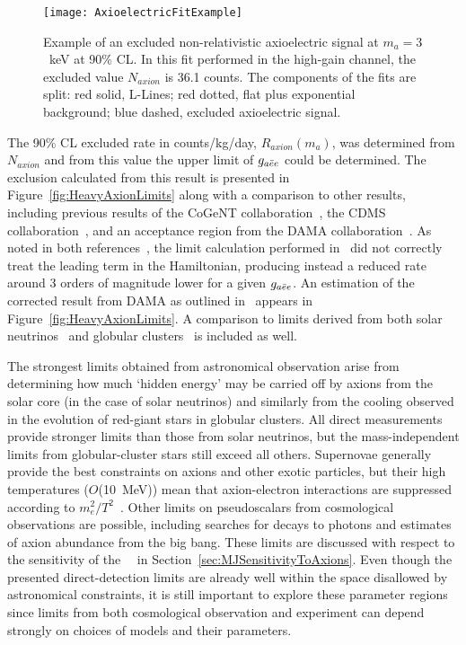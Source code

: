		\begin{figure}
			\centering
			\texttt{[image: AxioelectricFitExample]}
			\caption[Example of an excluded non-relativistic axioelectric signal at $m_{a}=3$~keV at 
			90\% CL]{Example of an excluded non-relativistic axioelectric signal at $m_{a}=3$~keV at 
			90\% CL.  In this fit performed in the high-gain channel, the excluded value $N_{axion}$ 
			is 36.1 counts.  
			The components of the fits are split: red solid, L-Lines; red dotted, flat plus exponential
			background; blue dashed, excluded axioelectric signal.}
			\label{fig:ExampleHeavyAxionFit}
		\end{figure}
			
	The 90\% CL excluded rate in counts/kg/day, $R_{axion}(m_{a})$, was determined from $N_{axion}$
and from this value the upper limit of $g_{a\bar{e}e}$ could be determined.  The exclusion calculated from this result is presented in Figure~\ref{fig:HeavyAxionLimits} 
along with a comparison to other results, including previous results of the CoGeNT collaboration~\cite{Aalseth:2008aa}, the CDMS 
collaboration~\cite{Ahmed2009}, and an acceptance region from the DAMA collaboration~\cite{Bernabei:2005ca}.  As noted in both 
references~\cite{Collar:2009sp,Pospelov:2008jk}, the limit calculation performed in~\cite{Bernabei:2005ca} did not correctly treat the 
leading term in the Hamiltonian, producing instead a reduced rate around 3 orders of magnitude lower for a given $g_{a\bar{e}e}$.  An estimation 
of the corrected result from DAMA as outlined in~\cite{Collar:2009sp} appears in Figure~\ref{fig:HeavyAxionLimits}.  A comparison to 
limits derived from both solar neutrinos~\cite{Gondolo09} and globular clusters~\cite{Raffelt95} is included as well.  

The strongest limits obtained from astronomical observation arise from determining how much `hidden energy' may be carried off by axions from the solar 
core (in the case of solar neutrinos) and similarly from the cooling observed in the evolution of red-giant stars in globular clusters.  All 
direct measurements provide stronger limits than those from solar neutrinos, but the mass-independent limits from globular-cluster 
stars still exceed all others.  Supernovae generally provide the best constraints on axions and other exotic particles, but their high temperatures ($O$(10~MeV)) mean that axion-electron interactions are suppressed according to $m_{e}^{2}/T^{2}$~\cite{Pospelov:2008jk}.  Other limits on pseudoscalars from cosmological observations are possible, including searches for decays to photons and estimates of axion abundance from the big bang.  These limits are discussed with respect to the sensitivity of the \MJ~\minmod~in Section~\ref{sec:MJSensitivityToAxions}.  Even though the presented direct-detection limits are already well within the space disallowed by astronomical constraints, it is still important to explore these parameter regions since limits from both cosmological observation and experiment can depend strongly on choices of models and their parameters.
			
